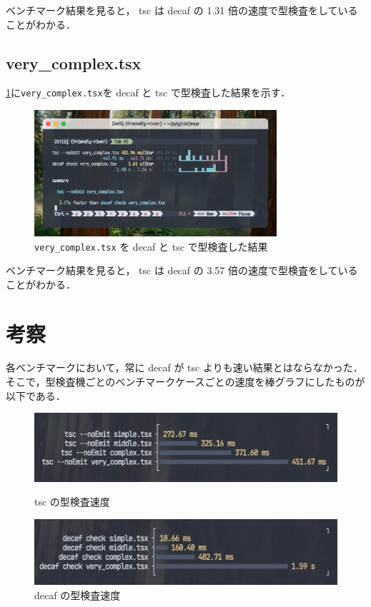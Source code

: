 ベンチマーク結果を見ると， tsc は decaf の 1.31 倍の速度で型検査をしていることがわかる．

\subsection{very\_complex.tsx}

\ref{fig:very_complex}に\texttt{very\_complex.tsx}を decaf と tsc で型検査した結果を示す．

\begin{figure}[H]
    \centering
    \includegraphics[width=0.8\textwidth]{figures/fig_exp_1_very_complex_tsx.png}
    \caption{\texttt{very\_complex.tsx} を decaf と tsc で型検査した結果}
    \label{fig:very_complex}
\end{figure}

ベンチマーク結果を見ると， tsc は decaf の 3.57 倍の速度で型検査をしていることがわかる．

\section{考察}
\label{sec:consideration}

各ベンチマークにおいて，常に decaf が tsc よりも速い結果とはならなかった．
そこで，型検査機ごとのベンチマークケースごとの速度を棒グラフにしたものが以下である．

\begin{figure}[H]
    \centering
    \begin{minipage}[b]{0.49\columnwidth}
        \includegraphics[width=\columnwidth]{figures/fig_exp_1_tsc_barplot.png}
        \caption{tsc の型検査速度}
        \label{fig:barplot_tsc}
    \end{minipage}
    \begin{minipage}[b]{0.49\columnwidth}
        \includegraphics[width=\columnwidth]{figures/fig_exp_1_decaf_barplot.png}
        \caption{decaf の型検査速度}
        \label{fig:barplot_decaf}
    \end{minipage}
\end{figure}

